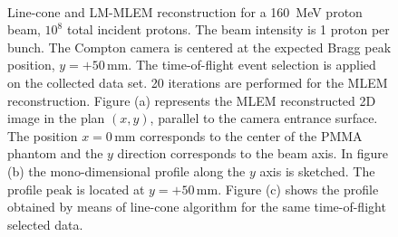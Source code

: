 \begin{figure}
\centering
{}
\\
\caption{Line-cone and LM-MLEM reconstruction for a 160~MeV proton beam, $10^{8}$ total incident protons. The beam intensity is 1 proton per bunch. The Compton camera is centered at the expected Bragg peak position, $y=+50\,$mm. The time-of-flight event selection is applied on the collected data set. 20 iterations are performed for the MLEM reconstruction.
Figure (a) represents the MLEM reconstructed 2D image in the plan $(x,y)$, parallel to the camera entrance surface. The position $x=0\,$mm corresponds to the center of the PMMA phantom and the $y$ direction corresponds to the beam axis.  In figure (b) the mono-dimensional profile along the $y$ axis is sketched. The profile peak is located at $y=+50\,$mm. Figure (c) shows the profile obtained by means of line-cone algorithm for the same time-of-flight selected data.}
\label{fig:comparison}
\end{figure}


